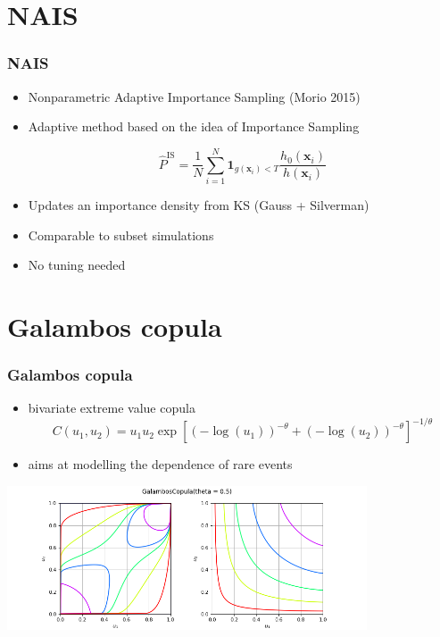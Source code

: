 \documentclass{beamer}
\begin{document}

\section{NAIS}


\begin{frame}[containsverbatim]
\frametitle{NAIS}

\begin{itemize}
\item Nonparametric Adaptive Importance Sampling (Morio 2015)

\item Adaptive method based on the idea of Importance Sampling

$$
\widehat{P}^\text{IS}=\frac{1}{N} \sum_{i=1}^{N} {\mathbf{1}}_{g(\mathbf{x}_i)<T} \frac{h_0(\mathbf{x}_i)}{h(\mathbf{x}_i)}
$$

\item Updates an importance density from KS (Gauss + Silverman)

\item Comparable to subset simulations

\item No tuning needed
\end{itemize}


\end{frame}



\section{Galambos copula}


\begin{frame}
\frametitle{Galambos copula}

\begin{itemize}
\item bivariate extreme value copula
$$ C(u_1, u_2) = u_1u_2\exp\left[(-\log(u_1))^{-\theta} + (-\log(u_2))^{-\theta}\right]^{-1/\theta} $$
\item aims at modelling the dependence of rare events
\end{itemize}

\begin{center}
\includegraphics[width=0.8\textwidth]{figures/openturns-GalambosCopula-1.png}
\end{center}

\end{frame}
\end{document}
